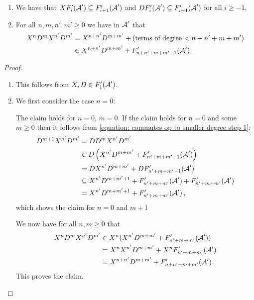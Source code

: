 \begin{lemma}
  \label{lemma: two monomonial commute up to smaller degree}
  \leavevmode
  \begin{enumerate}
    \item
      We have that $X F'_i(\operatorname{\mathcal{A}}') \subseteq F'_{i+1}(\operatorname{\mathcal{A}}')$ and $D F'_i(\operatorname{\mathcal{A}}') \subseteq F'_{i+1}(\operatorname{\mathcal{A}}')$ for all $i \geq -1$.
    \item
      For all $n, m, n', m' \geq 0$ we have in $\operatorname{\mathcal{A}}'$ that
      \begin{align*}
              X^n D^m X^{n'} D^{m'}
        &=    X^{n+n'} D^{m+m'} + (\text{terms of degree $< n+n'+m+m'$})  \\
        &\in  X^{n+n'} D^{m+m'} + F'_{n+n'+m+m'-1}(\operatorname{\mathcal{A}}') \,.
      \end{align*}
  \end{enumerate}
\end{lemma}


\begin{proof}
  \leavevmode
  \begin{enumerate}
    \item
      This follows from $X, D \in F'_1(\operatorname{\mathcal{A}}')$.
    \item
      We first consider the case $n = 0$:
      
      The claim holds for $n = 0$, $m = 0$.
      If the claim holds for $n = 0$ and some $m \geq 0$ then it follows from \eqref{equation: commutes op to smaller degree step 1}:
      \begin{align*}
                    D^{m+1} X^{n'} D^{m'}
        &=          D D^{m} X^{n'} D^{m'}                                         \\
        &\in        D \left( X^{n'} D^{m+m'} + F'_{n'+m+m'-1}(\operatorname{\mathcal{A}}') \right)    \\
        &=          D X^{n'} D^{m+m'} + D F'_{n'+m+m'-1}(\operatorname{\mathcal{A}}')                 \\
        &\subseteq    X^{n'} D^{m+m'+1}
                    + F'_{n'+m+m'}(\operatorname{\mathcal{A}}')
                    + F'_{n'+m+m'}(\operatorname{\mathcal{A}}')                                       \\
        &=            X^{n'} D^{m+m'+1}
                    + F'_{n'+m+m'}(\operatorname{\mathcal{A}}') \,,
      \end{align*}
      which shows the claim for $n = 0$ and $m+1$
      
      We now have for all $n, m \geq 0$ that
      \begin{align*}
              X^n D^m X^{n'} D^{m'}
        &\in  X^n ( X^{n'} D^{m + m'} + F'_{n' + m + m'}(\operatorname{\mathcal{A}}') ) \\
        &=    X^n X^{n'} D^{m + m'} + X^n F'_{n' + m + m'}(\operatorname{\mathcal{A}}') \\
        &=    X^{n + n'} D^{m + m'} + F'_{n + n' + m + m'}(\operatorname{\mathcal{A}}') \,.
      \end{align*}
      This proves the claim.
    \qedhere
  \end{enumerate}
\end{proof}



